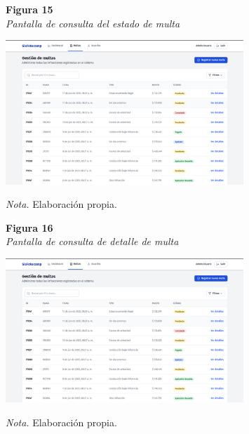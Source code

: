 \documentclass[
    letterpaper, 
    man,   
    spanish,
    12pt,
    donotrepeattitle,
    floatsintext,
    hidelinks %
]{apa7}
\begin{document}
\begin{figure}[htbp]
    \begin{flushleft}
        \textbf{Figura 15}\\
        \textit{Pantalla de consulta del estado de multa}
    \end{flushleft}
    \centering
    \includegraphics[width=0.8\textwidth]{Images/UI4.png}
    \vspace{0.5em}
    \begin{flushleft}
        \textit{Nota.} Elaboración propia.
    \end{flushleft}
    \label{fig:consulta_estado_multa}
\end{figure}

\begin{figure}[htbp]
    \begin{flushleft}
        \textbf{Figura 16}\\
        \textit{Pantalla de consulta de detalle de multa}
    \end{flushleft}
    \centering
    \includegraphics[width=0.8\textwidth]{Images/UI4.png}
    \vspace{0.5em}
    \begin{flushleft}
        \textit{Nota.} Elaboración propia.
    \end{flushleft}
    \label{fig:consulta_detalle_multa}
\end{figure}
\end{document}
